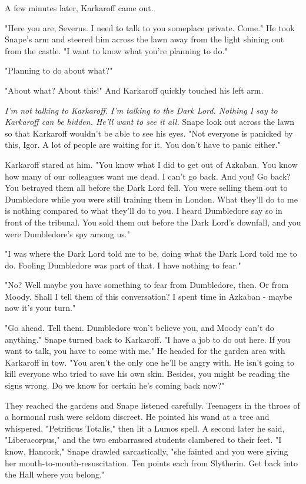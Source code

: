 A few minutes later, Karkaroff came out.

"Here you are, Severus. I need to talk to you someplace private. Come." He took Snape's arm and steered him across the lawn away from the light shining out from the castle. "I want to know what you're planning to do."

"Planning to do about what?"

"About what? About this!" And Karkaroff quickly touched his left arm.

\emph{I'm not talking to Karkaroff. I'm talking to the Dark Lord. Nothing I say to Karkaroff can be hidden. He'll want to see it all.} Snape look out across the lawn so that Karkaroff wouldn't be able to see his eyes. "Not everyone is panicked by this, Igor. A lot of people are waiting for it. You don't have to panic either."

Karkaroff stared at him. "You know what I did to get out of Azkaban. You know how many of our colleagues want me dead. I can't go back. And you! Go back? You betrayed them all before the Dark Lord fell. You were selling them out to Dumbledore while you were still training them in London. What they'll do to me is nothing compared to what they'll do to you. I heard Dumbledore say so in front of the tribunal. You sold them out before the Dark Lord's downfall, and you were Dumbledore's spy among us."

"I was where the Dark Lord told me to be, doing what the Dark Lord told me to do. Fooling Dumbledore was part of that. I have nothing to fear."

"No? Well maybe you have something to fear from Dumbledore, then. Or from Moody. Shall I tell them of this conversation? I spent time in Azkaban - maybe now it's your turn."

"Go ahead. Tell them. Dumbledore won't believe you, and Moody can't do anything." Snape turned back to Karkaroff. "I have a job to do out here. If you want to talk, you have to come with me." He headed for the garden area with Karkaroff in tow. "You aren't the only one he'll be angry with. He isn't going to kill everyone who tried to save his own skin. Besides, you might be reading the signs wrong. Do we know for certain he's coming back now?"

They reached the gardens and Snape listened carefully. Teenagers in the throes of a hormonal rush were seldom discreet. He pointed his wand at a tree and whispered, "Petrificus Totalis," then lit a Lumos spell. A second later he said, "Liberacorpus," and the two embarrassed students clambered to their feet. "I know, Hancock," Snape drawled sarcastically, "she fainted and you were giving her mouth-to-mouth-resuscitation. Ten points each from Slytherin. Get back into the Hall where you belong."

